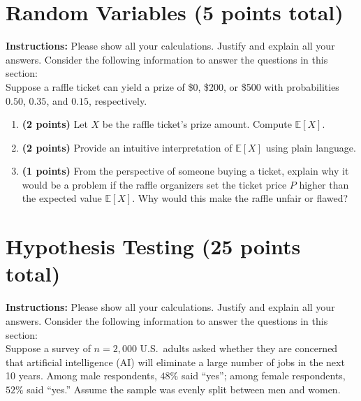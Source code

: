 \documentclass{article}
\newcommand{\blankbox}[2][3cm]{%
    \vspace{-0.5em}
    \begin{figure}[H]
        \makebox[\linewidth]{%
            \begin{tcolorbox}[
                colback=white, 
                colframe=white,  %
                width=#2, %
                height=#1,
                boxrule=0.2mm
            ]
            \end{tcolorbox}
        }
    \end{figure}
    \vspace{-2em}
}
\begin{document}
\newpage

\section{Random Variables (5 points total)}
\noindent\textbf{Instructions:} Please show all your calculations. Justify and explain all your answers. Consider the following information to answer the questions in this section: \\

Suppose a raffle ticket can yield a prize of \$0, \$200, or \$500 with probabilities $0.50$, $0.35$, and $0.15$, respectively.
\begin{enumerate}
\item \textbf{(2 points)}  Let $X$ be the raffle ticket's prize amount. Compute $\mathbb{E}[X]$. \blankbox[6cm]{1.0\linewidth}
\item \textbf{(2 points)} Provide an intuitive interpretation of $\mathbb{E}[X]$ using plain language. \blankbox[7cm]{1.0\linewidth}
\item \textbf{(1 points)} From the perspective of someone buying a ticket, explain why it would be a problem if the raffle organizers set the ticket price $P$ higher than the expected value $\mathbb{E}[X]$. Why would this make the raffle unfair or flawed? \blankbox[6cm]{1.0\linewidth}

\end{enumerate}

\newpage

\section{Hypothesis Testing (25 points total)}
\noindent\textbf{Instructions:} Please show all your calculations. Justify and explain all your answers. Consider the following information to answer the questions in this section: \\

Suppose a survey of $n = 2{,}000$ U.S.\ adults asked whether they are concerned that artificial intelligence (AI) will eliminate a large number of jobs in the next 10 years. Among male respondents, $48\%$ said “yes”; among female respondents, $52\%$ said “yes.” Assume the sample was evenly split between men and women.
\end{document}
